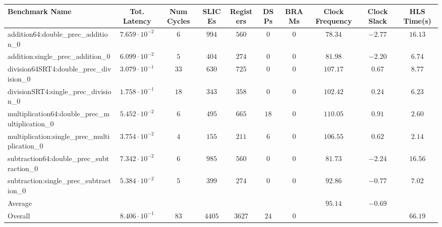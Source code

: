 \begin{tabular}{|l|c|c|c|c|c|c|c|c|c|}
\hline
Benchmark Name                                   & Tot. Latency            & Num Cycles & SLICEs   & Registers & DSPs   & BRAMs & Clock Frequency & Clock Slack & HLS Time(s) \\
\hline
addition64:double\_prec\_addition\_0             & $ 7.659 \cdot 10^{-2} $ & $ 6      $ & $ 994  $ & $ 560   $ & $ 0  $ & $ 0 $ & $ 78.34       $ & $ -2.77   $ & $ 16.13   $ \\
addition:single\_prec\_addition\_0               & $ 6.099 \cdot 10^{-2} $ & $ 5      $ & $ 404  $ & $ 274   $ & $ 0  $ & $ 0 $ & $ 81.98       $ & $ -2.20   $ & $ 6.74    $ \\
division64SRT4:double\_prec\_division\_0         & $ 3.079 \cdot 10^{-1} $ & $ 33     $ & $ 630  $ & $ 725   $ & $ 0  $ & $ 0 $ & $ 107.17      $ & $ 0.67    $ & $ 8.77    $ \\
divisionSRT4:single\_prec\_division\_0           & $ 1.758 \cdot 10^{-1} $ & $ 18     $ & $ 343  $ & $ 358   $ & $ 0  $ & $ 0 $ & $ 102.42      $ & $ 0.24    $ & $ 6.23    $ \\
multiplication64:double\_prec\_multiplication\_0 & $ 5.452 \cdot 10^{-2} $ & $ 6      $ & $ 495  $ & $ 665   $ & $ 18 $ & $ 0 $ & $ 110.05      $ & $ 0.91    $ & $ 2.60    $ \\
multiplication:single\_prec\_multiplication\_0   & $ 3.754 \cdot 10^{-2} $ & $ 4      $ & $ 155  $ & $ 211   $ & $ 6  $ & $ 0 $ & $ 106.55      $ & $ 0.62    $ & $ 2.14    $ \\
subtraction64:double\_prec\_subtraction\_0       & $ 7.342 \cdot 10^{-2} $ & $ 6      $ & $ 985  $ & $ 560   $ & $ 0  $ & $ 0 $ & $ 81.73       $ & $ -2.24   $ & $ 16.56   $ \\
subtraction:single\_prec\_subtraction\_0         & $ 5.384 \cdot 10^{-2} $ & $ 5      $ & $ 399  $ & $ 274   $ & $ 0  $ & $ 0 $ & $ 92.86       $ & $ -0.77   $ & $ 7.02    $ \\
\hline
Average                                          & $                     $ & $        $ & $      $ & $       $ & $    $ & $   $ & $ 95.14       $ & $ -0.69   $ & $         $ \\
\hline
Overall                                          & $ 8.406 \cdot 10^{-1} $ & $ 83     $ & $ 4405 $ & $ 3627  $ & $ 24 $ & $ 0 $ & $             $ & $         $ & $ 66.19   $ \\
\hline
\end{tabular}
